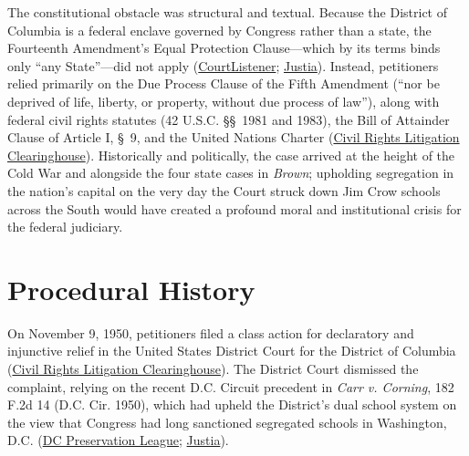 \documentclass[12pt]{article}
\begin{document}
The constitutional obstacle was structural and textual. Because the District of Columbia is a federal enclave governed by Congress rather than a state, the Fourteenth Amendment's Equal Protection Clause---which by its terms binds only ``any State''---did not apply (\href{https://www.courtlistener.com/opinion/105222/bolling-v-sharpe/}{CourtListener}; \href{https://supreme.justia.com/cases/federal/us/347/497/}{Justia}). Instead, petitioners relied primarily on the Due Process Clause of the Fifth Amendment (``nor be deprived of life, liberty, or property, without due process of law''), along with federal civil rights statutes (42 U.S.C. \S\S~1981 and 1983), the Bill of Attainder Clause of Article I, \S~9, and the United Nations Charter (\href{https://clearinghouse.net/case/11110/}{Civil Rights Litigation Clearinghouse}). Historically and politically, the case arrived at the height of the Cold War and alongside the four state cases in \textit{Brown}; upholding segregation in the nation's capital on the very day the Court struck down Jim Crow schools across the South would have created a profound moral and institutional crisis for the federal judiciary.

\section{Procedural History}

On November 9, 1950, petitioners filed a class action for declaratory and injunctive relief in the United States District Court for the District of Columbia (\href{https://clearinghouse.net/case/11110/}{Civil Rights Litigation Clearinghouse}). The District Court dismissed the complaint, relying on the recent D.C. Circuit precedent in \textit{Carr v. Corning}, 182 F.2d 14 (D.C. Cir. 1950), which had upheld the District's dual school system on the view that Congress had long sanctioned segregated schools in Washington, D.C. (\href{https://historicsites.dcpreservation.org/items/show/969}{DC Preservation League}; \href{https://supreme.justia.com/cases/federal/us/347/497/}{Justia}).
\end{document}
